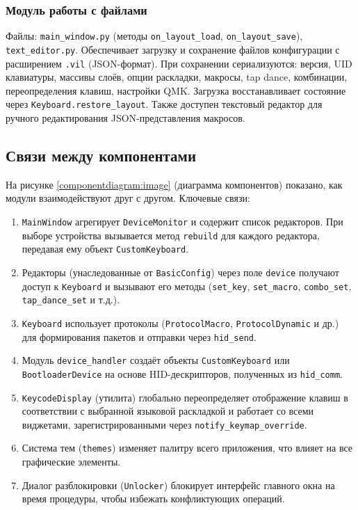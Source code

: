 \subsubsection{Модуль работы с файлами}
Файлы: \texttt{main\_window.py} (методы \texttt{on\_layout\_load}, \texttt{on\_layout\_save}), \texttt{text\_editor.py}.
Обеспечивает загрузку и сохранение файлов конфигурации с расширением \texttt{.vil} (JSON-формат). При сохранении сериализуются: версия, UID клавиатуры, массивы слоёв, опции раскладки, макросы, tap dance, комбинации, переопределения клавиш, настройки QMK. Загрузка восстанавливает состояние через \texttt{Keyboard.restore\_layout}. Также доступен текстовый редактор для ручного редактирования JSON-представления макросов.

\subsection{Связи между компонентами}

На рисунке \ref{componentdiagram:image} (диаграмма компонентов) показано, как модули взаимодействуют друг с другом. Ключевые связи:

\begin{enumerate}
	\item \texttt{MainWindow} агрегирует \texttt{DeviceMonitor} и содержит список редакторов. При выборе устройства вызывается метод \texttt{rebuild} для каждого редактора, передавая ему объект \texttt{CustomKeyboard}.
	\item Редакторы (унаследованные от \texttt{BasicConfig}) через поле \texttt{device} получают доступ к \texttt{Keyboard} и вызывают его методы (\texttt{set\_key}, \texttt{set\_macro}, \texttt{combo\_set}, \texttt{tap\_dance\_set} и т.д.).
	\item \texttt{Keyboard} использует протоколы (\texttt{ProtocolMacro}, \texttt{ProtocolDynamic} и др.) для формирования пакетов и отправки через \texttt{hid\_send}.
	\item Модуль \texttt{device\_handler} создаёт объекты \texttt{CustomKeyboard} или \texttt{BootloaderDevice} на основе HID-дескрипторов, полученных из \texttt{hid\_comm}.
	\item \texttt{KeycodeDisplay} (утилита) глобально переопределяет отображение клавиш в соответствии с выбранной языковой раскладкой и работает со всеми виджетами, зарегистрированными через \texttt{notify\_keymap\_override}.
	\item Система тем (\texttt{themes}) изменяет палитру всего приложения, что влияет на все графические элементы.
	\item Диалог разблокировки (\texttt{Unlocker}) блокирует интерфейс главного окна на время процедуры, чтобы избежать конфликтующих операций.
\end{enumerate}

